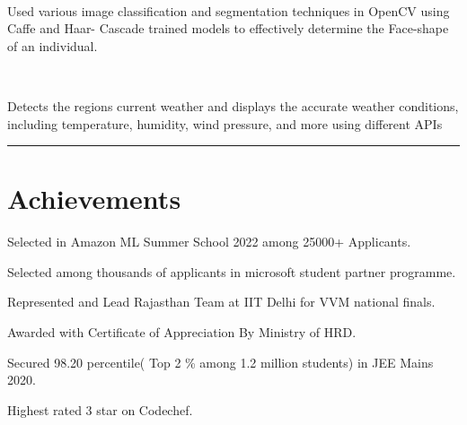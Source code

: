\documentclass[]{deedy-resume-openfont}
\begin{document}
        
            \hfill {}\\
            \begin{tightemize}
  \item Used various image classification and segmentation techniques in OpenCV using Caffe and Haar- Cascade trained models to effectively determine the Face-shape of an individual.
\end{tightemize}
            \sectionsep
          
        
           \hfill {}\\
            \begin{tightemize}
                \item Detects the region\textquotesingle{}s current weather and displays the accurate
weather conditions, including temperature, humidity, wind
pressure, and more using different APIs
              \end{tightemize}
            \sectionsep


%
%
\par\noindent\rule{\textwidth}{0.4pt}
\section{Achievements}
\begin{tightemize}
\item Selected in {  {Amazon ML Summer School 2022}} among 25000+ Applicants.\\
\item Selected among thousands of applicants in {  {microsoft student partner}} programme.
\item Represented and Lead Rajasthan Team at {  {IIT Delhi}} for {  { VVM national finals.}}\\
\item Awarded with Certificate of Appreciation By {  {Ministry of HRD.}}\\
\item Secured 98.20 percentile({  {Top 2 \% among 1.2 million students}}) in JEE Mains 2020.\\
\item Highest rated 3 star on{  { Codechef}}. 

\end{tightemize}
      \ 
      
\end{document}
